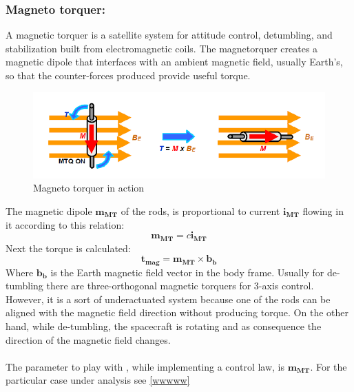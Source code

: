 \documentclass[11pt]{article}
\begin{document}
\subsubsection{Magneto torquer:}
A magnetic torquer  is a satellite system for attitude control, detumbling, and stabilization built from electromagnetic coils. The magnetorquer creates a magnetic dipole that interfaces with an ambient magnetic field, usually Earth's, so that the counter-forces produced provide useful torque.
\begin{figure} [H]
\centering 
\includegraphics[scale=0.7]{Magneto_torquers1.PNG}
\caption{ Magneto torquer in action
\cite{MAgneto1}}
\end{figure}
The magnetic dipole $\mathbf{m_{MT}}$ of the rods, is proportional to current $\mathbf{i_{MT}}$ flowing  in it according to this relation:
\begin{equation}
\mathbf{m_{MT}}= c\mathbf{i_{MT}}
\end{equation}
 Next the torque is calculated:
\begin{equation}
\mathbf{t_{mag}}=\mathbf{m_{MT}}\times \mathbf{b_b}
\end{equation}
Where $\mathbf{b_b}$ is the Earth magnetic field vector in the body frame. Usually for de-tumbling there are  three-orthogonal magnetic torquers for 3-axis control. However, it is a sort of underactuated system because one of the rods can be aligned with the magnetic field direction without producing torque. On the other hand, while de-tumbling, the spacecraft is rotating and as consequence the direction of the magnetic field changes.\\\\
The parameter to play with , while implementing a  control law, is $\mathbf{m_{MT}}$. For the particular case under analysis see \ref{wwwww}
\end{document}

